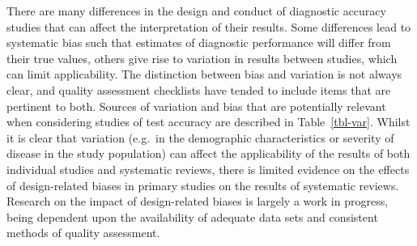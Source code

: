 \documentclass[
  11pt,
  a4paper,
  DIV=11,
  numbers=noendperiod]{scrreprt}
\begin{document}
There are many differences in the design and conduct of diagnostic
accuracy studies that can affect the interpretation of their results.
Some differences lead to systematic bias such that estimates of
diagnostic performance will differ from their true values, others give
rise to variation in results between studies, which can limit
applicability. The distinction between bias and variation is not always
clear, and quality assessment checklists have tended to include items
that are pertinent to both. Sources of variation and bias that are
potentially relevant when considering studies of test accuracy are
described in Table~\ref{tbl-var}. Whilst it is clear that variation
(e.g.~in the demographic characteristics or severity of disease in the
study population) can affect the applicability of the results of both
individual studies and systematic reviews, there is limited evidence on
the effects of design-related biases in primary studies on the results
of systematic reviews. Research on the impact of design-related biases
is largely a work in progress, being dependent upon the availability of
adequate data sets and consistent methods of quality assessment.
\end{document}
